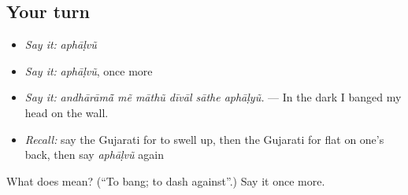 \subsection*{Your turn}
\begin{itemize}
\raggedright
  \item \emph{Say it:} \emph{aphāḷvũ}
  \item \emph{Say it:} \emph{aphāḷvũ}, once more
  \item \emph{Say it:} \emph{andhārāmā̃ mẽ māthũ dīvāl sāthe aphāḷyũ.} — In the dark I banged my head on the wall.
  \item \emph{Recall:} say the Gujarati for to swell up, then the Gujarati for flat on one's back, then say \emph{aphāḷvũ} again
\end{itemize}

\begin{tcolorbox}[breakable,colback=teal!4,colframe=teal!35!black,title={Before you move on}]
What does  mean? (\textquotedblleft{}To bang; to dash against\textquotedblright{}.) Say it once more.
\end{tcolorbox}
